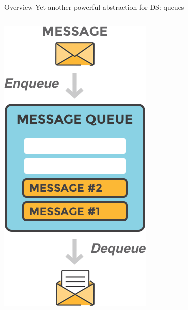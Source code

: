 \documentclass{beamer}\mode<presentation>{\usetheme{AMSBolognaFC}}
\begin{document}
\begin{frame}{Overview}
    Yet another powerful abstraction for DS: \alert{queues}
    \begin{columns}
        \begin{column}{.26\linewidth}
            \begin{center}
                \includegraphics[width=\linewidth]{img/queue.png}

\end{center}
\end{column}
\end{columns}
\end{frame}
\end{document}
